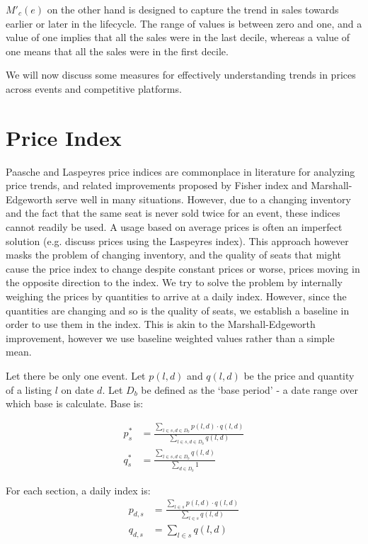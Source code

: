 \documentclass[letterpaper, 12pt]{article}
\begin{document}
$M'_c(e)$ on the other hand is designed to capture the trend in sales towards earlier or later in the lifecycle. The range of values is between zero and one, and a value of one implies that all the sales were in the last decile, whereas a value of one means that all the sales were in the first decile. 

We will now discuss some measures for effectively understanding trends in prices across events and competitive platforms. 
\section{Price Index}\label{prm}
Paasche and Laspeyres price indices are commonplace in literature for analyzing price trends, and related improvements proposed by Fisher index and Marshall-Edgeworth serve well in many situations. However, due to a changing inventory and the fact that the same seat is never sold twice for an event, these indices cannot readily be used. A usage based on average prices is often an imperfect solution (e.g. \cite{tremblaynfl} discuss prices using the Laspeyres index). This approach however masks the problem of changing inventory, and the quality of seats that might cause the price index to change despite constant prices or worse, prices moving in the opposite direction to the index. We try to solve the problem by internally weighing the prices by quantities to arrive at a daily index. However, since the quantities are changing and so is the quality of seats, we establish a baseline in order to use them in the index. This is akin to the Marshall-Edgeworth improvement, however we use baseline weighted values rather than a simple mean.

Let there be only one event. Let $p(l,d)$ and $q(l,d)$ be the price and quantity of a listing $l$ on date $d$. Let $D_b$ be defined as the `base period' - a date range over which base is calculate. Base is:

\begin{align*}
	p^*_s &= \frac{\sum_{l\in s, d\in D_b} p(l,d)\cdot q(l,d)}{\sum_{l\in s, d\in D_b} q(l,d)} \\
	q^*_s &= \frac{\sum_{l\in s, d\in D_b} q(l,d)}{\sum_{d\in D_b} 1} 
\end{align*}

For each section, a daily index is:
\begin{align*}
	p_{d,s} &= \frac{\sum_{l\in s} p(l,d)\cdot q(l,d)}{\sum_{l\in s} q(l,d)}\\
	q_{d,s} &= \sum_{l\in s} q(l,d)
\end{align*}
\end{document}
